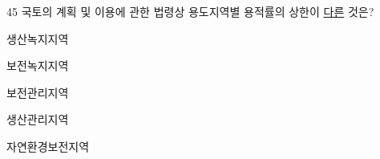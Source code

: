 \begin{question}{45}
국토의 계획 및 이용에 관한 법령상 용도지역별 용적률의 상한이 \uline{다른} 것은?
\begin{choices}
  \item 생산녹지지역
  \item 보전녹지지역
  \item 보전관리지역
  \item 생산관리지역
  \item 자연환경보전지역
\end{choices}
\end{question}
